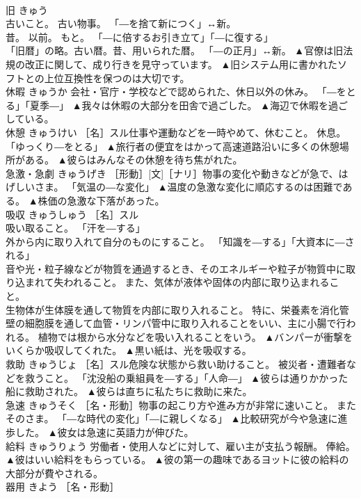 \documentclass[8pt]{extreport}
\begin{document}
\begin{CJK}{UTF8}{min}
\\	旧	きゅう	
\\	古いこと。 古い物事。 「―を捨て新につく」↔新。 
\\	昔。 以前。 もと。 「―に倍するお引き立て」「―に復する」 
\\	「旧暦」の略。古い暦。昔、用いられた暦。 「―の正月」↔新。	▲官僚は旧法規の改正に関して、成り行きを見守っています。 ▲旧システム用に書かれたソフトとの上位互換性を保つのは大切です。
\\	休暇	きゅうか	会社・官庁・学校などで認められた、休日以外の休み。 「―をとる」「夏季―」	▲我々は休暇の大部分を田舎で過ごした。 ▲海辺で休暇を過ごしている。
\\	休憩	きゅうけい	［名］スル仕事や運動などを一時やめて、休むこと。 休息。 「ゆっくり―をとる」	▲旅行者の便宜をはかって高速道路沿いに多くの休憩場所がある。 ▲彼らはみんなその休憩を待ち焦がれた。
\\	急激・急劇	きゅうげき	［形動］[文]［ナリ］物事の変化や動きなどが急で、はげしいさま。 「気温の―な変化」	▲温度の急激な変化に順応するのは困難である。 ▲株価の急激な下落があった。
\\	吸収	きゅうしゅう	［名］スル 
\\	吸い取ること。 「汗を―する」 
\\	外から内に取り入れて自分のものにすること。 「知識を―する」「大資本に―される」 
\\	音や光・粒子線などが物質を通過するとき、そのエネルギーや粒子が物質中に取り込まれて失われること。 また、気体が液体や固体の内部に取り込まれること。 
\\	生物体が生体膜を通して物質を内部に取り入れること。 特に、栄養素を消化管壁の細胞膜を通して血管・リンパ管中に取り入れることをいい、主に小腸で行われる。 植物では根から水分などを吸い入れることをいう。	▲バンパーが衝撃をいくらか吸収してくれた。 ▲黒い紙は、光を吸収する。
\\	救助	きゅうじょ	［名］スル危険な状態から救い助けること。 被災者・遭難者などを救うこと。 「沈没船の乗組員を―する」「人命―」	▲彼らは通りかかった船に救助された。 ▲彼らは直ちに私たちに救助に来た。
\\	急速	きゅうそく	［名・形動］物事の起こり方や進み方が非常に速いこと。 またそのさま。 「―な時代の変化」「―に親しくなる」	▲比較研究が今や急速に進歩した。 ▲彼女は急速に英語力が伸びた。
\\	給料	きゅうりょう	労働者・使用人などに対して、雇い主が支払う報酬。 俸給。	▲彼はいい給料をもらっている。 ▲彼の第一の趣味であるヨットに彼の給料の大部分が費やされる。
\\	器用	きよう	［名・形動］ 

\end{CJK}
\end{document}
